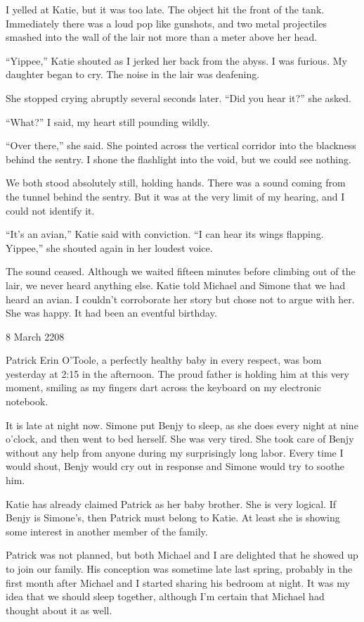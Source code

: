 \documentclass[]{article}
\begin{document}
I yelled at Katie, but it was too late.  The object hit the front of the tank.  Immediately there was a loud pop like gunshots, and two metal projectiles smashed into the wall of the lair not more than a meter above her head.

“Yippee,” Katie shouted as I jerked her back from the abyss.  I was furious.  My daughter began to cry.  The noise in the lair was deafening.

She stopped crying abruptly several seconds later.  “Did you hear it?” she asked.

“What?” I said, my heart still pounding wildly.

“Over there,” she said.  She pointed across the vertical corridor into the blackness behind the sentry.  I shone the flashlight into the void, but we could see nothing.

We both stood absolutely still, holding hands.  There was a sound coming from the tunnel behind the sentry.  But it was at the very limit of my hearing, and I could not identify it.

“It’s an avian,” Katie said with conviction.  “I can hear its wings flapping.  Yippee,” she shouted again in her loudest voice.

The sound ceased.  Although we waited fifteen minutes before climbing out of the lair, we never heard anything else.  Katie told Michael and Simone that we had heard an avian.  I couldn’t corroborate her story but chose not to argue with her.  She was happy.  It had been an eventful birthday.

8 March 2208

Patrick Erin O’Toole, a perfectly healthy baby in every respect, was bom yesterday at 2:15 in the afternoon.  The proud father is holding him at this very moment, smiling as my fingers dart across the keyboard on my electronic notebook.

It is late at night now.  Simone put Benjy to sleep, as she does every night at nine o’clock, and then went to bed herself.  She was very tired.  She took care of Benjy without any help from anyone during my surprisingly long labor.  Every time I would shout, Benjy would cry out in response and Simone would try to soothe him.

Katie has already claimed Patrick as her baby brother.  She is very logical.  If Benjy is Simone’s, then Patrick must belong to Katie.  At least she is showing some interest in another member of the family.

Patrick was not planned, but both Michael and I are delighted that he showed up to join our family.  His conception was sometime late last spring, probably in the first month after Michael and I started sharing his bedroom at night.  It was my idea that we should sleep together, although I’m certain that Michael had thought about it as well.
\end{document}
